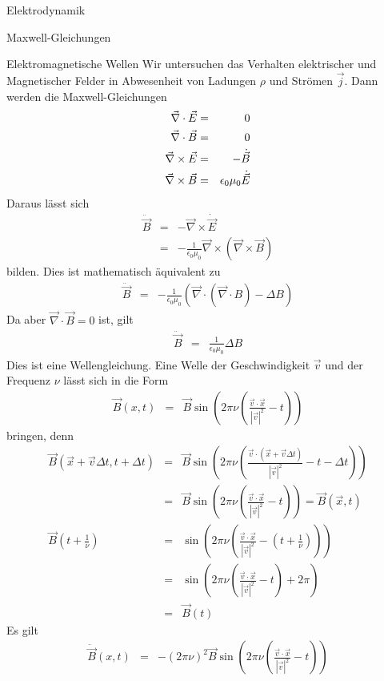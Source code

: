 \begin{chapter}{\titlestr}
\begin{section}{Elektrodynamik}
\begin{subsection}{Maxwell-Gleichungen}
\begin{subsubsection}{Elektromagnetische Wellen}
Wir untersuchen das Verhalten elektrischer und Magnetischer Felder in Abwesenheit von Ladungen $\rho$ und Strömen $\vec{j}$. Dann werden die Maxwell-Gleichungen
\begin{eqnarray*}
\vec{\nabla}\cdot\vec{E} &=& 0\cr
\vec{\nabla}\cdot\vec{B} &=& 0\cr
\vec{\nabla}\times\vec{E} &=& -\dot{\vec{B}}\cr
\vec{\nabla}\times\vec{B} &=& \epsilon_0\mu_0\dot{\vec{E}}
\end{eqnarray*}
Daraus lässt sich
\begin{eqnarray*}
\ddot{\vec{B}} &=& -\vec{\nabla}\times\dot{\vec{E}}\\
&=&-\frac{1}{\epsilon_0\mu_0}\vec{\nabla}\times\left(\vec{\nabla}\times\vec{B}\right)
\end{eqnarray*}
bilden. Dies ist mathematisch äquivalent zu
\begin{eqnarray*}
\ddot{\vec{B}}&=& -\frac{1}{\epsilon_0\mu_0}\left(\vec{\nabla}\cdot\left(\vec{\nabla}\cdot B\right)-\Delta B\right)
\end{eqnarray*}
Da aber $\vec{\nabla}\cdot\vec{B}=0$ ist, gilt
\begin{eqnarray*}
\ddot{\vec{B}}&=& \frac{1}{\epsilon_0\mu_0}\Delta B
\end{eqnarray*}
Dies ist eine Wellengleichung. Eine Welle der Geschwindigkeit $\vec{v}$ und der Frequenz $\nu$ lässt sich in die Form
\begin{eqnarray*}
\vec{B}(x,t) &=& \vec{B}\sin\left(2\pi\nu\left(\frac{\vec{v}\cdot \vec{x}}{|\vec{v}|^2}- t\right)\right)
\end{eqnarray*}
bringen, denn
\begin{eqnarray*}
\vec{B}(\vec{x}+\vec{v}\Delta t,t+\Delta t) &=& \vec{B}\sin\left(2\pi\nu\left(\frac{\vec{v}\cdot (\vec{x}+\vec{v}\Delta t)}{|\vec{v}|^2}- t-\Delta t\right)\right)\\
&=&\vec{B}\sin\left(2\pi\nu\left(\frac{\vec{v}\cdot \vec{x}}{|\vec{v}|^2}- t\right)\right) = \vec{B}(\vec{x},t)\\
\vec{B}\left(t+\frac{1}{\nu}\right) &=& \sin\left(2\pi\nu\left(\frac{\vec{v}\cdot \vec{x}}{|\vec{v}|^2}- \left(t+\frac{1}{\nu}\right)\right)\right)\\
&=& \sin\left(2\pi\nu\left(\frac{\vec{v}\cdot \vec{x}}{|\vec{v}|^2}- t\right)+2\pi\right)\\
&=& \vec{B}\left(t\right)
\end{eqnarray*}
Es gilt
\begin{eqnarray*}
\ddot{\vec{B}}(x,t) &=& -(2\pi\nu)^2\vec{B}\sin\left(2\pi\nu\left(\frac{\vec{v}\cdot \vec{x}}{|\vec{v}|^2}- t\right)\right)\\

\end{eqnarray*}
\end{subsubsection}
\end{subsection}
\end{section}
\end{chapter}
